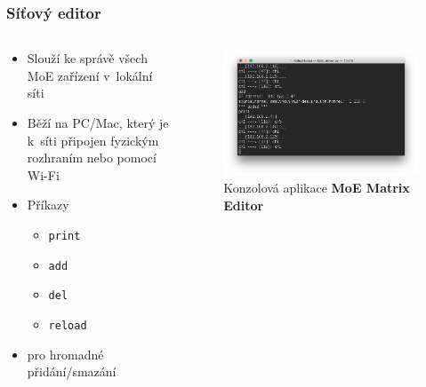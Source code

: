 \documentclass[%
  12pt,       				%
	t,                  %
	aspectratio=1610,   %
	unicode,						%
]{beamer}				    	%
\begin{document}
\begin{frame}
	\frametitle{Síťový editor}
	\begin{columns}[T]
		\begin{column}{0.4\textwidth}
			\begin{itemize}
				\item Slouží ke správě všech MoE zařízení v~lokální síti
				\item Běží na PC/Mac, který je k~síti připojen fyzickým rozhraním nebo pomocí Wi-Fi
				\item Příkazy
				\begin{itemize}
					\item \texttt{print}
					\item \texttt{add}
					\item \texttt{del}
					\item \texttt{reload}
				\end{itemize}
				\item {} pro hromadné přidání/smazání
			\end{itemize}
		\end{column}
		\begin{column}{0.6\textwidth}
			\begin{figure}
				\includegraphics[width=\linewidth]{obrazky/MoE_Editor_2.png}
				\caption{Konzolová aplikace \textbf{MoE Matrix Editor}}
			\end{figure}
		\end{column}
	\end{columns}
\end{frame}
\end{document}
